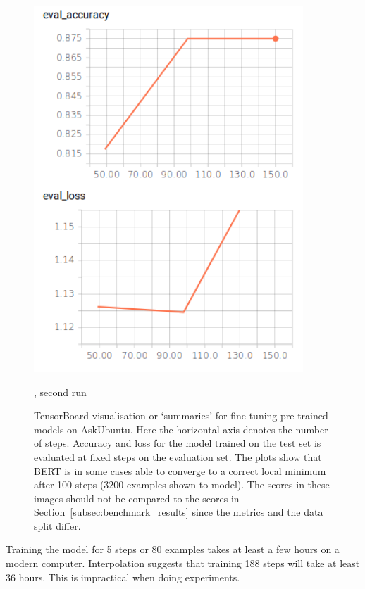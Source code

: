 \begin{figure}
\begin{minipage}{0.30\textwidth}
        \includegraphics[width=0.9\textwidth]{figures/tensorboard_askubuntu_large_2.png}
        \caption*{, second run}
    \end{minipage}
    \caption{TensorBoard visualisation or `summaries' for fine-tuning pre-trained models on AskUbuntu.
    Here the horizontal axis denotes the number of steps.
    Accuracy and loss for the model trained on the test set is evaluated at fixed steps on the evaluation set.
    The plots show that BERT is in some cases able to converge to a correct local minimum after 100 steps (3200 examples shown to model).
    The scores in these images should not be compared to the scores in Section~\ref{subsec:benchmark_results} since the metrics and the data split differ.}
    \label{fig:tensorboard}
\end{figure}
Training the model for 5 steps or 80 examples takes at least a few hours on a modern computer.
Interpolation suggests that training 188 steps will take at least 36 hours.
This is impractical when doing experiments.

